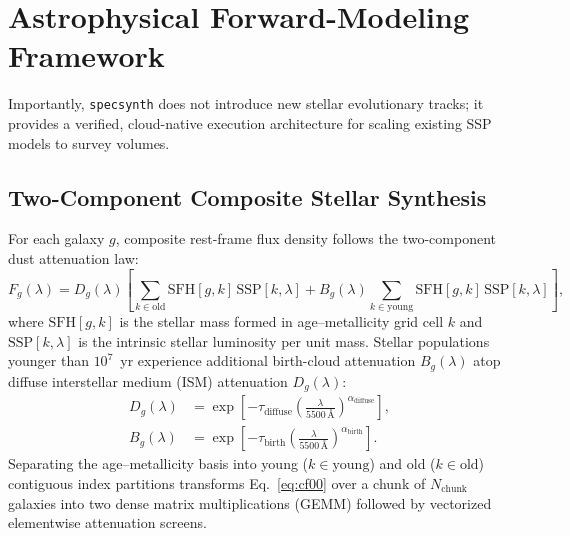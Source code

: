 \documentclass[preprint,12pt,authoryear]{elsarticle}
\begin{document}
\section{Astrophysical Forward-Modeling Framework}
\label{sec:physics}

Importantly, \texttt{specsynth} does not introduce new stellar evolutionary tracks; it provides a verified, cloud-native execution architecture for scaling existing SSP models to survey volumes.

\subsection{Two-Component Composite Stellar Synthesis}
For each galaxy $g$, composite rest-frame flux density follows the \citet{charlot2000simple} two-component dust attenuation law:
\begin{equation}
\label{eq:cf00}
F_g(\lambda) = D_g(\lambda)\!\left[\sum_{k \in \text{old}} \mathrm{SFH}[g,k]\,\mathrm{SSP}[k,\lambda] + B_g(\lambda)\sum_{k \in \text{young}} \mathrm{SFH}[g,k]\,\mathrm{SSP}[k,\lambda]\right],
\end{equation}
where $\mathrm{SFH}[g,k]$ is the stellar mass formed in age--metallicity grid cell $k$ and $\mathrm{SSP}[k,\lambda]$ is the intrinsic stellar luminosity per unit mass. Stellar populations younger than $10^7$~yr experience additional birth-cloud attenuation $B_g(\lambda)$ atop diffuse interstellar medium (ISM) attenuation $D_g(\lambda)$:
\begin{align}
D_g(\lambda) &= \exp\!\left[-\tau_{\text{diffuse}}\left(\frac{\lambda}{5500\,\text{\AA}}\right)^{\alpha_{\text{diffuse}}}\right], \label{eq:diffuse} \\
B_g(\lambda) &= \exp\!\left[-\tau_{\text{birth}}\left(\frac{\lambda}{5500\,\text{\AA}}\right)^{\alpha_{\text{birth}}}\right]. \label{eq:birth}
\end{align}
Separating the age--metallicity basis into young ($k \in \text{young}$) and old ($k \in \text{old}$) contiguous index partitions transforms Eq.~\eqref{eq:cf00} over a chunk of $N_{\text{chunk}}$ galaxies into two dense matrix multiplications (GEMM) followed by vectorized elementwise attenuation screens.
\end{document}
